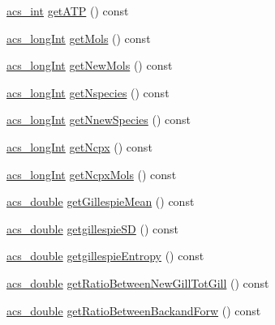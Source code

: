 \begin{DoxyCompactItemize}
\item 
\hyperlink{acs__headers_8h_a8d277355641a098190360234e2ebde35}{acs\-\_\-int} \hyperlink{classenvironment_a02346c5d824e83e0a76dd01f4672ad8b}{get\-A\-T\-P} () const 
\item 
\hyperlink{acs__headers_8h_a19319d75f02db4308bc5c0026d98cd85}{acs\-\_\-long\-Int} \hyperlink{classenvironment_a5a2ee72147144e7a04f4b363f1cc0914}{get\-Mols} () const 
\item 
\hyperlink{acs__headers_8h_a19319d75f02db4308bc5c0026d98cd85}{acs\-\_\-long\-Int} \hyperlink{classenvironment_a57e1eb6043a54fbebd2ac01ebdac9fa1}{get\-New\-Mols} () const 
\item 
\hyperlink{acs__headers_8h_a19319d75f02db4308bc5c0026d98cd85}{acs\-\_\-long\-Int} \hyperlink{classenvironment_aebc2bf6d400686a73dae1f6162cfeadc}{get\-Nspecies} () const 
\item 
\hyperlink{acs__headers_8h_a19319d75f02db4308bc5c0026d98cd85}{acs\-\_\-long\-Int} \hyperlink{classenvironment_a4a2b21d139acc93ae0fdf29c8b025cce}{get\-Nnew\-Species} () const 
\item 
\hyperlink{acs__headers_8h_a19319d75f02db4308bc5c0026d98cd85}{acs\-\_\-long\-Int} \hyperlink{classenvironment_a5f6c40cbf788d58db588dc6280f0174f}{get\-Ncpx} () const 
\item 
\hyperlink{acs__headers_8h_a19319d75f02db4308bc5c0026d98cd85}{acs\-\_\-long\-Int} \hyperlink{classenvironment_a39bb98a336b69f25479b8f82b9928bd3}{get\-Ncpx\-Mols} () const 
\item 
\hyperlink{acs__headers_8h_ab776853a005fcbf56af0424a2a4dd607}{acs\-\_\-double} \hyperlink{classenvironment_a389a70abe42c7652c9511b7ed3b974c0}{get\-Gillespie\-Mean} () const 
\item 
\hyperlink{acs__headers_8h_ab776853a005fcbf56af0424a2a4dd607}{acs\-\_\-double} \hyperlink{classenvironment_a41d9f79794b74845f2d00b4c0affea02}{getgillespie\-S\-D} () const 
\item 
\hyperlink{acs__headers_8h_ab776853a005fcbf56af0424a2a4dd607}{acs\-\_\-double} \hyperlink{classenvironment_af4cba1a1f9c1c0106241ca5338b7906d}{getgillespie\-Entropy} () const 
\item 
\hyperlink{acs__headers_8h_ab776853a005fcbf56af0424a2a4dd607}{acs\-\_\-double} \hyperlink{classenvironment_a98a4989029d77e99cf2ca9fb0eb1c2ab}{get\-Ratio\-Between\-New\-Gill\-Tot\-Gill} () const 
\item 
\hyperlink{acs__headers_8h_ab776853a005fcbf56af0424a2a4dd607}{acs\-\_\-double} \hyperlink{classenvironment_aa0e7940868932ac4b26fd61943952528}{get\-Ratio\-Between\-Backand\-Forw} () const 

\end{DoxyCompactItemize}
